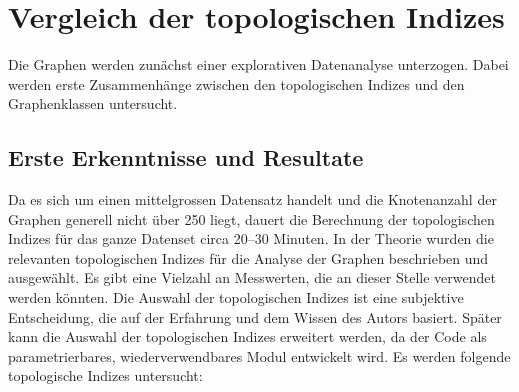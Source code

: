 \section{Vergleich der topologischen Indizes} \label{sec:correlation}

Die Graphen werden zunächst einer explorativen Datenanalyse unterzogen.
Dabei werden erste Zusammenhänge zwischen den topologischen Indizes und den Graphenklassen untersucht.

\subsection{Erste Erkenntnisse und Resultate}

Da es sich um einen mittelgrossen Datensatz handelt und die Knotenanzahl der Graphen generell nicht über 250 liegt, dauert die Berechnung der topologischen Indizes für das ganze Datenset circa 20–30 Minuten.
In der Theorie wurden die relevanten topologischen Indizes für die Analyse der Graphen beschrieben und ausgewählt.
Es gibt eine Vielzahl an Messwerten, die an dieser Stelle verwendet werden könnten.
Die Auswahl der topologischen Indizes ist eine subjektive Entscheidung, die auf der Erfahrung und dem Wissen des Autors basiert.
Später kann die Auswahl der topologischen Indizes erweitert werden, da der Code als parametrierbares, wiederverwendbares Modul entwickelt wird.
Es werden folgende topologische Indizes untersucht:


